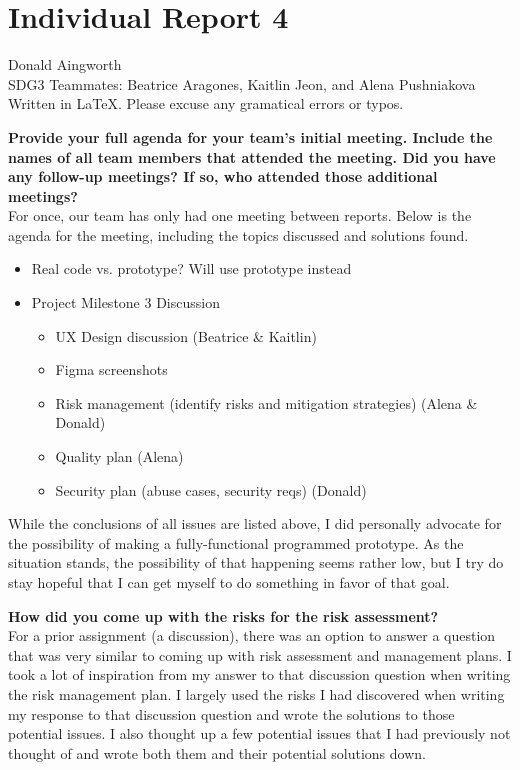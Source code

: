 \documentclass[10pt]{article}
\begin{document}
\section*{Individual Report 4}
Donald Aingworth\\
SDG3 Teammates: Beatrice Aragones, Kaitlin Jeon, and Alena Pushniakova\\
Written in \LaTeX. Please excuse any gramatical errors or typos. 

\textbf{Provide your full agenda for your team's initial meeting. Include the names of all team members that attended the meeting. Did you have any follow-up meetings? If so, who attended those additional meetings?}\\
For once, our team has only had one meeting between reports. 
Below is the agenda for the meeting, including the topics discussed and solutions found.
\begin{itemize}
    \item Real code vs. prototype? Will use prototype instead
    \item Project Milestone 3 Discussion
    \begin{itemize}
        \item UX Design discussion (Beatrice \& Kaitlin)
        \item Figma screenshots
        \item Risk management (identify risks and mitigation strategies) (Alena \& Donald)
        \item Quality plan (Alena)
        \item Security plan (abuse cases, security reqs) (Donald)
    \end{itemize}
\end{itemize}
While the conclusions of all issues are listed above, I did personally advocate for the possibility of making a fully-functional programmed prototype.
As the situation stands, the possibility of that happening seems rather low, but I try do stay hopeful that I can get myself to do something in favor of that goal.

\textbf{How did you come up with the risks for the risk assessment?}\\
For a prior assignment (a discussion), there was an option to answer a question that was very similar to coming up with risk assessment and management plans.
I took a lot of inspiration from my answer to that discussion question when writing the risk management plan.
I largely used the risks I had discovered when writing my response to that discussion question and wrote the solutions to those potential issues.
I also thought up a few potential issues that I had previously not thought of and wrote both them and their potential solutions down.
\end{document}
